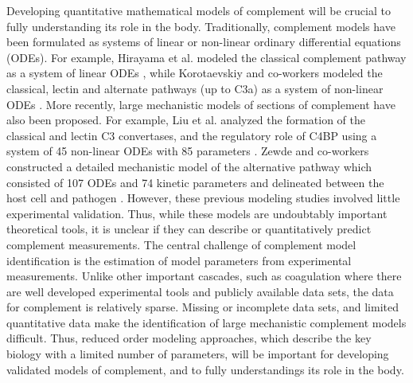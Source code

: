 \documentclass[12pt]{article}
\begin{document}
Developing quantitative mathematical models of complement will be crucial to fully understanding its role in the body.
Traditionally, complement models have been formulated as systems of linear or non-linear ordinary differential equations (ODEs).
For example, Hirayama et al. modeled the classical complement pathway as a system of linear ODEs \cite{hirayama1996linear},
while Korotaevskiy and co-workers modeled the classical, lectin and alternate pathways (up to C3a) as a system of non-linear ODEs \cite{korotaevskiy2009non}.
More recently, large mechanistic models of sections of complement have also been proposed.
For example, Liu et al. analyzed the formation of the classical and lectin C3 convertases, and the regulatory role of C4BP using a system of 45 non-linear ODEs with 85 parameters \cite{liu2011computational}.
Zewde and co-workers constructed a detailed mechanistic model of the alternative pathway which consisted of 107 ODEs and 74 kinetic parameters and delineated between
the host cell and pathogen \cite{zewde2016quantitative}.
However, these previous modeling studies involved little experimental validation.
Thus, while these models are undoubtably important theoretical tools, it is unclear if they can describe or quantitatively predict complement measurements.
The central challenge of complement model identification is the estimation of model parameters from experimental measurements.
Unlike other important cascades, such as coagulation where there are well developed experimental tools and publicly available data sets,
the data for complement is relatively sparse. Missing or incomplete data sets, and limited quantitative data make the identification of large mechanistic complement models difficult.
Thus, reduced order modeling approaches, which describe the key biology with a limited number of parameters, will be important for developing validated models of complement, and to fully understandings its role in the body.

\end{document}
